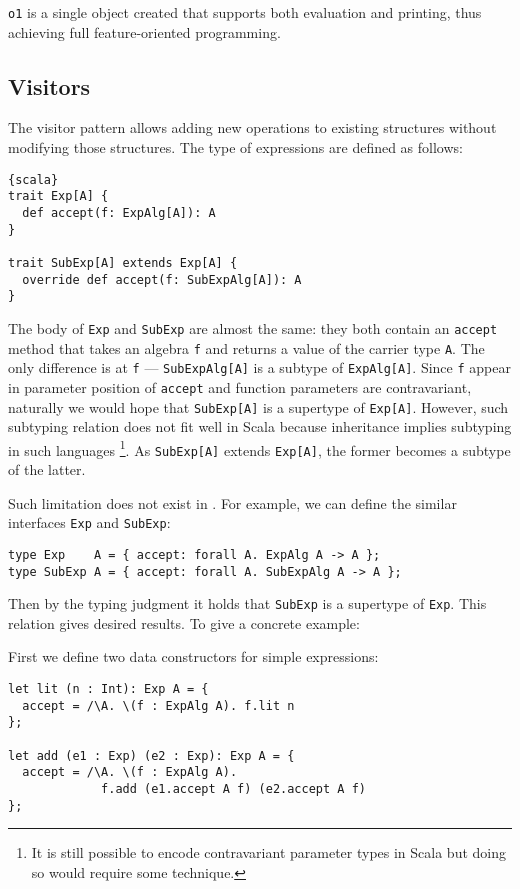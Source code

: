 \lstinline{o1} is a single object created that supports both evaluation and
printing, thus achieving full feature-oriented programming.

\subsection{Visitors}

The visitor pattern allows adding new operations to existing structures without
modifying those structures. The type of expressions are defined as follows:

\begin{lstlisting}{scala}
trait Exp[A] {
  def accept(f: ExpAlg[A]): A
}

trait SubExp[A] extends Exp[A] {
  override def accept(f: SubExpAlg[A]): A
}
\end{lstlisting}

The body of \lstinline{Exp} and \lstinline{SubExp} are almost the same: they
both contain an \lstinline{accept} method that takes an algebra \lstinline{f}
and returns a value of the carrier type \lstinline{A}. The only difference is at
\lstinline{f} --- \lstinline{SubExpAlg[A]} is a subtype of
\lstinline{ExpAlg[A]}. Since \lstinline{f} appear in parameter position of
\lstinline{accept} and function parameters are contravariant, naturally we would
hope that \lstinline{SubExp[A]} is a supertype of \lstinline{Exp[A]}. However,
such subtyping relation does not fit well in Scala because inheritance implies
subtyping in such languages \footnote{It is still possible to encode
  contravariant parameter types in Scala but doing so would require some
  technique.}. As \lstinline{SubExp[A]} extends \lstinline{Exp[A]}, the former
becomes a subtype of the latter.

Such limitation does not exist in \name. For example, we can define the similar interfaces \lstinline{Exp} and \lstinline{SubExp}:
\begin{lstlisting}
type Exp    A = { accept: forall A. ExpAlg A -> A };
type SubExp A = { accept: forall A. SubExpAlg A -> A };
\end{lstlisting}
Then by the typing judgment it holds that \lstinline{SubExp} is a supertype of
\lstinline{Exp}. This relation gives desired results. To give a concrete example:

First we define two data constructors for simple expressions:
\begin{lstlisting}
let lit (n : Int): Exp A = {
  accept = /\A. \(f : ExpAlg A). f.lit n
};

let add (e1 : Exp) (e2 : Exp): Exp A = {
  accept = /\A. \(f : ExpAlg A).
             f.add (e1.accept A f) (e2.accept A f)
};
\end{lstlisting}

